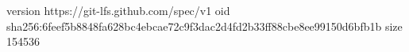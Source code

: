 version https://git-lfs.github.com/spec/v1
oid sha256:6feef5b8848fa628bc4ebcae72c9f3dac2d4fd2b33ff88cbe8ee99150d6bfb1b
size 154536
